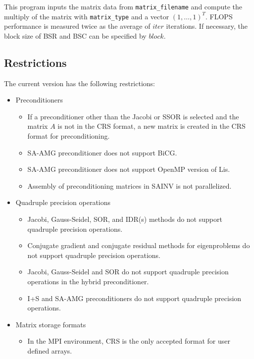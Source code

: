 \documentclass[a4paper]{article}
\begin{document}
This program inputs the matrix data from {\tt matrix\_filename} 
and compute the multiply of the matrix 
with \verb|matrix_type| and a vector $(1,\dots,1)^T$. 
FLOPS performance is measured twice as the average of $iter$ iterations. 
If necessary, the block size of BSR and BSC can be specified by $block$.

\newpage
\subsection{Restrictions}

The current version has the following restrictions:
\begin{itemize}
\item Preconditioners
\begin{itemize}
\item If a preconditioner other than the Jacobi or SSOR is selected 
      and the matrix $A$ is not in the CRS format, a new matrix is created 
      in the CRS format for preconditioning.
\item SA-AMG preconditioner does not support BiCG. 
\item SA-AMG preconditioner does not support OpenMP version of Lis. 
\item Assembly of preconditioning matrices in SAINV is not parallelized. 

\end{itemize}

\item Quadruple precision operations
\begin{itemize}
\item Jacobi, Gauss-Seidel, SOR, and IDR(s) methods do not support quadruple precision operations.
\item Conjugate gradient and conjugate residual methods for eigenproblems do not support quadruple precision operations.
\item Jacobi, Gauss-Seidel and SOR do not support quadruple precision operations in the hybrid preconditioner.
\item I+S and SA-AMG preconditioners do not support quadruple precision operations.
\end{itemize}

\item Matrix storage formats
\begin{itemize}
\item In the MPI environment, CRS is the only accepted format for user defined arrays.
\end{itemize}
\end{itemize}
\vspace*{5mm}
\end{document}
